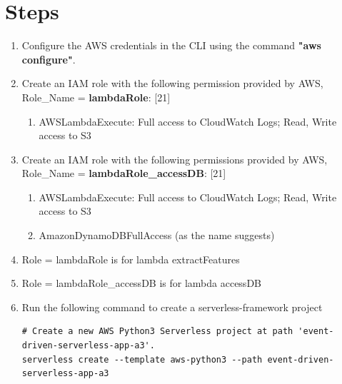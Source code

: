     \section{Steps}
    \begin{enumerate}
        \item Configure the AWS credentials in the CLI using the command \textbf{"aws configure"}.
        \item Create an IAM role with the following permission provided by AWS, Role\_Name = \textbf{lambdaRole}: [21]
        \begin{enumerate}
            \item AWSLambdaExecute: Full access to CloudWatch Logs; Read, Write access to S3
        \end{enumerate}  
        \item Create an IAM role with the following permissions provided by AWS, Role\_Name = \textbf{lambdaRole\_accessDB}: [21]
        \begin{enumerate}
            \item AWSLambdaExecute: Full access to CloudWatch Logs; Read, Write access to S3
            \item AmazonDynamoDBFullAccess (as the name suggests)
        \end{enumerate}  
        \item Role = lambdaRole is for lambda extractFeatures
        \item Role = lambdaRole\_accessDB is for lambda accessDB
        
        \item Run the following command to create a serverless-framework project



\begin{mdframed}[linewidth=1pt]
\begin{lstlisting}
# Create a new AWS Python3 Serverless project at path 'event-driven-serverless-app-a3'.
serverless create --template aws-python3 --path event-driven-serverless-app-a3
\end{lstlisting}
\end{mdframed}


\end{enumerate}

